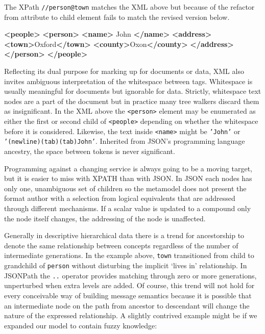 \documentclass[]{article}
\newenvironment{Shaded}{}{}
\newcommand{\KeywordTok}[1]{\textcolor[rgb]{0.00,0.44,0.13}{\textbf{{#1}}}}
\newcommand{\NormalTok}[1]{{#1}}
\begin{document}
The XPath \texttt{//person@town} matches the XML above but because of
the refactor from attribute to child element fails to match the revised
version below.

\begin{Shaded}
\begin{Highlighting}[]
\KeywordTok{<people>}
   \KeywordTok{<person>}
      \KeywordTok{<name>}
         \NormalTok{John}
      \KeywordTok{</name>}
      \KeywordTok{<address>}
         \KeywordTok{<town>}\NormalTok{Oxford}\KeywordTok{</town>} \KeywordTok{<county>}\NormalTok{Oxon}\KeywordTok{</county>}
      \KeywordTok{</address>}
   \KeywordTok{</person>}
\KeywordTok{</people>}
\end{Highlighting}
\end{Shaded}

Reflecting its dual purpose for marking up for documents or data, XML
also invites ambiguous interpretation of the whitespace between tags.
Whitespace is usually meaningful for documents but ignorable for data.
Strictly, whitespace text nodes are a part of the document but in
practice many tree walkers discard them as insignificant. In the XML
above the \texttt{\textless{}person\textgreater{}} element may be
enumerated as either the first or second child of
\texttt{\textless{}people\textgreater{}} depending on whether the
whitespace before it is considered. Likewise, the text inside
\texttt{\textless{}name\textgreater{}} might be \texttt{'John'} or
\texttt{'(newline)(tab)(tab)John'}. Inherited from JSON's programming
language ancestry, the space between tokens is never significant.

Programming against a changing service is always going to be a moving
target, but it is easier to miss with XPATH than with JSON. In JSON each
nodes has only one, unambiguous set of children so the metamodel does
not present the format author with a selection from logical equivalents
that are addressed through different mechanisms. If a scalar value is
updated to a compound only the node itself changes, the addressing of
the node is unaffected.

Generally in descriptive hierarchical data there is a trend for
ancestorship to denote the same relationship between concepts regardless
of the number of intermediate generations. In the example above,
\texttt{town} transitioned from child to grandchild of \texttt{person}
without disturbing the implicit `lives in' relationship. In JSONPath the
\texttt{..} operator provides matching through zero or more generations,
unperturbed when extra levels are added. Of course, this trend will not
hold for every conceivable way of building message semantics because it
is possible that an intermediate node on the path from ancestor to
descendant will change the nature of the expressed relationship. A
slightly contrived example might be if we expanded our model to contain
fuzzy knowledge:
\end{document}
